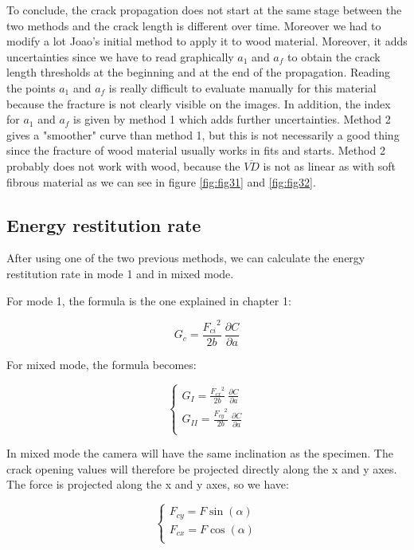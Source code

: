 To conclude, the crack propagation does not start at the same stage between the two methods and the crack length is different over time. Moreover we had to modify a lot Joao's initial method to apply it to wood material. Moreover, it adds uncertainties since we have to read graphically $a_1$ and $a_f$ to obtain the crack length thresholds at the beginning and at the end of the propagation. Reading the points $a_1$ and $a_f$ is really difficult to evaluate manually for this material because the fracture is not clearly visible on the images. In addition, the index for $a_1$ and $a_f$ is given by method 1 which adds further uncertainties. Method 2 gives a "smoother" curve than method 1, but this is not necessarily a good thing since the fracture of wood material usually works in fits and starts. Method 2 probably does not work with wood, because the $\overline{VD}$ is not as linear as with soft fibrous material  as we can see in figure \ref{fig:fig31} and \ref{fig:fig32}.

\subsection{Energy restitution rate}

After using one of the two previous methods, we can calculate the energy restitution rate in mode 1 and in mixed mode.

For mode 1, the formula is the one explained in chapter 1:

\begin{equation}
	G_c=\frac{{F_{ci}}^2}{2b}\ \frac{\partial C}{\partial a}
\end{equation}

For mixed mode, the formula becomes:

\begin{equation}
	\begin{cases}
		G_I=\frac{{F_{cx}}^2}{2b}\ \frac{\partial C}{\partial a} \\
		G_{II}=\frac{{F_{cy}}^2}{2b}\ \frac{\partial C}{\partial a}\\ 
	\end{cases}
\end{equation}

In mixed mode the camera will have the same inclination as the specimen. The crack opening values will therefore be projected directly along the x and y axes. The force is projected along the x and y axes, so we have:

\begin{equation}
	\begin{cases}
		F_{cy}=F \sin(\alpha) \\
		F_{cx}=F \cos(\alpha) \\ 
	\end{cases}
\end{equation}

